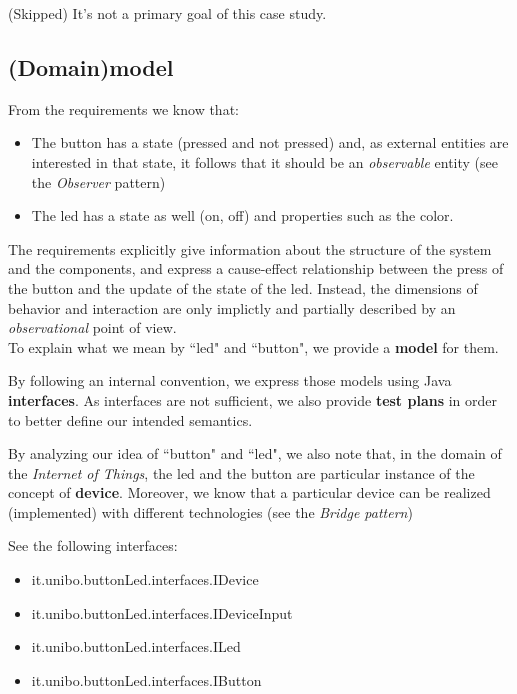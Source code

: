 \documentclass{article}
\begin{document}
 (Skipped) It's not a primary goal of this case study.

\subsection{(Domain)model}



From the requirements we know that:

\begin{itemize}
  \item The button has a state (pressed
  and not pressed) and, as external entities are interested in that state, it
  follows that it should be an \emph{observable} entity (see the
  \emph{Observer} pattern)
  \item The led has a state as well (on, off) and properties such as the color.
\end{itemize}

The requirements explicitly give information about the structure of the system
and the components, and express a cause-effect relationship between the press of
the button and the update of the state of the led. Instead, the dimensions of
behavior and interaction are only implictly and partially described by an
\emph{observational} point of view.	\\
 
To explain what we mean by ``led" and ``button", we provide a \textbf{model} for
them.

By following an internal convention, we express those models using Java
\textbf{interfaces}. As interfaces are not sufficient, we also provide
\textbf{test plans} in order to better define our intended semantics.
 
By analyzing our idea of ``button" and ``led", we also note that, in the domain
of the \emph{Internet of Things}, the led and the button are particular
instance of the concept of \textbf{device}. Moreover, we know that a
particular device can be realized (implemented) with different technologies
(see the \emph{Bridge pattern})

See the following interfaces:

\begin{itemize}
  \item it.unibo.buttonLed.interfaces.IDevice
  \item it.unibo.buttonLed.interfaces.IDeviceInput
  \item it.unibo.buttonLed.interfaces.ILed
  \item it.unibo.buttonLed.interfaces.IButton
\end{itemize}    
\end{document}
